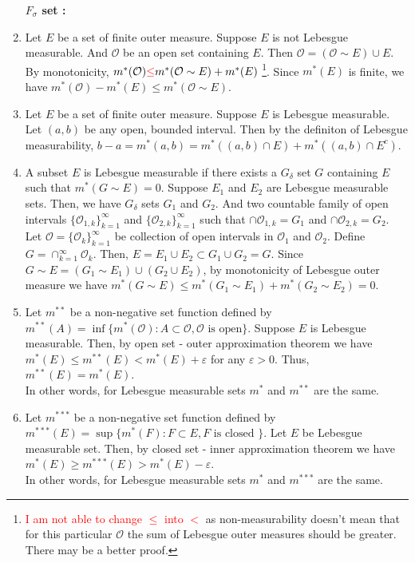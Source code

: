 \begin{enumerate}
	\textbf{$F_\sigma$ set : }
\item
 	Let $E$ be a set of finite outer measure.
	Suppose $E$ is not Lebesgue measurable.
	And $\mathcal{O}$ be an open set containing $E$.
	Then $\mathcal{O} = (\mathcal{O} \sim E) \cup E$.
		By monotonicity, $m^\ast(\mathcal{O}) \textcolor{red}{ \le } m^\ast(\mathcal{O} \sim E) + m^\ast(E)$
		\dag\footnote{\textcolor{red}{I am not able to change $\le$ into $<$} as non-measurability doesn't mean that for this particular $\mathcal{O}$ the sum of Lebesgue outer measures should be greater. There may be a better proof.}.
	Since $m^\ast(E)$ is finite, we have $m^\ast(\mathcal{O}) - m^\ast(E) \le m^\ast(\mathcal{O} \sim E)$.
\item  Let $E$ be a set of finite outer measure.
	Suppose $E$ is Lebesgue measurable.
	Let $(a,b)$ be any open, bounded interval.
	Then by the definiton of Lebesgue measurability, $b-a = m^\ast(a,b) = m^\ast((a,b) \cap E) + m^\ast((a,b) \cap E^c)$.
\item  
 	A subset $E$ is Lebesgue measurable if there exists a $G_\delta$ set $G$ containing $E$ such that $m^\ast(G \sim E) = 0$.
	Suppose $E_1$ and $E_2$ are Lebesgue measurable sets.	
	Then, we have $G_\delta$ sets $G_1$ and $G_2$.
	And two countable family of open intervals $\{\mathcal{O}_{1,k}\}_{k=1}^\infty$ and $\{ \mathcal{O}_{2,k}\}_{k=1}^\infty$ such that $\cap \mathcal{O}_{1,k} = G_1$ and $\cap \mathcal{O}_{2,k} = G_2$.
	Let $\mathcal{O} = \{ \mathcal{O}_k \}_{k=1}^\infty$ be collection of open intervals in $\mathcal{O}_1$ and $\mathcal{O}_2$.
	Define $G = \cap_{k=1}^\infty \mathcal{O}_k$.
	Then, $E = E_1 \cup E_2 \subset G_1 \cup G_2 = G$.
	Since $G \sim E = (G_1 \sim E_1) \cup (G_2 \cup E_2)$, by monotonicity of Lebesgue outer measure we have $m^\ast(G \sim E) \le m^\ast(G_1 \sim E_1) + m^\ast(G_2 \sim E_2) = 0$.
\item
	Let $m^{\ast\ast}$ be a non-negative set function defined by $m^{\ast\ast}(A) = \inf \{ m^\ast(\mathcal{O}) : A \subset \mathcal{O}, \mathcal{O} \text{ is open} \}$.
	Suppose $E$ is Lebesgue measurable.
	Then, by open set - outer approximation theorem
	we have $m^\ast(E) \le m^{\ast\ast}(E) < m^\ast(E) + \varepsilon$ for any $\varepsilon > 0$.
	Thus, $m^{\ast\ast}(E) = m^\ast(E)$. \\

	In other words, for Lebesgue measurable sets $m^\ast$ and $m^{\ast\ast}$ are the same.
\item  
	Let $m^{\ast\ast\ast}$ be a non-negative set function defined by $m^{\ast\ast\ast}(E) = \sup \{ m^\ast(F) : F \subset E, F \text{ is closed } \}$.
	Let $E$ be Lebesgue measurable set.
	Then, by closed set - inner approximation theorem
	we have $m^\ast(E) \ge m^{\ast\ast\ast}(E) > m^\ast(E)-\varepsilon$.\\

	In other words, for Lebesgue measurable sets $m^\ast$ and $m^{\ast\ast\ast}$ are the same.
\end{enumerate}

